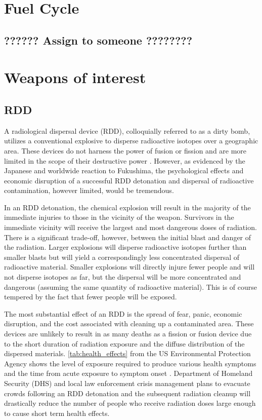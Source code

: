 \documentclass{report}
\begin{document}
\section{Fuel Cycle}

\subsection{??????   Assign to someone  ????????}


\section{Weapons  of interest}

\subsection{RDD} \label{sec:RDD}

A radiological dispersal device (RDD), colloquially referred to as a dirty bomb, utilizes a conventional explosive to disperse radioactive isotopes over a geographic area. These devices do not harness the power of fusion or fission and are more limited in the scope of their destructive power \cite{Renewal2011}.  However, as evidenced by the Japanese and worldwide reaction to Fukushima, the psychological effects and economic disruption of a successful RDD detonation and dispersal of radioactive contamination, however limited, would be tremendous.
 
In an RDD detonation, the chemical explosion will result in the majority of the immediate injuries to those in the  vicinity of the weapon. Survivors in the immediate vicinity will receive the largest and most dangerous doses of radiation. There is a significant trade-off, however, between the initial blast and danger of the radiation. Larger explosions will disperse radioactive isotopes  further than smaller blasts but will yield a correspondingly less concentrated dispersal of radioactive material. Smaller explosions will directly injure fewer people and will not disperse isotopes as far,  but the dispersal will be more concentrated and dangerous (assuming the same quantity of radioactive material). This is of course tempered by the fact that fewer people will be exposed.

The most substantial effect of an RDD is the spread of fear, panic, economic disruption, and the cost associated with cleaning up a contaminated area. These devices are unlikely to result in as many deaths as a fission or fusion device due to the short duration of radiation exposure and the diffuse distribution of the dispersed materials. \autoref{tab:health_effects} from the US Environmental Protection Agency shows the level of exposure required to produce various health symptoms and the time from acute exposure to symptom onset \cite{USEPA1999}. Department of Homeland Security (DHS) and local law enforcement crisis management plans to evacuate crowds following an RDD detonation and the subsequent radiation cleanup will drastically reduce the number of people who receive radiation doses large enough to cause short term health effects.
\end{document}
